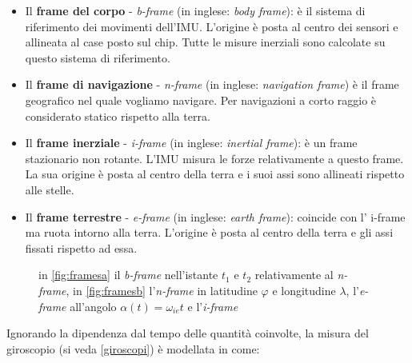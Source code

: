 \begin{itemize}
	\item Il \textbf{frame del corpo} - \textit{b-frame} (in inglese: \textit{body frame}): è il sistema							 di riferimento dei movimenti dell'IMU. L'origine è posta al centro dei sensori e allineata al case posto sul chip. Tutte le misure inerziali sono calcolate su questo sistema di riferimento.
	\item Il \textbf{frame di navigazione} - \textit{n-frame} (in inglese: \textit{navigation frame}) è il frame geografico nel quale vogliamo navigare. Per navigazioni a corto raggio è considerato statico rispetto alla terra.
	\item Il \textbf{frame inerziale} - \textit{i-frame} (in inglese: \textit{inertial frame}): è un frame stazionario non rotante. L'IMU misura le forze relativamente a questo frame. La sua origine è posta al centro della terra e i suoi assi sono allineati rispetto alle stelle.
	\item Il \textbf{frame terrestre} - \textit{e-frame} (in inglese: \textit{earth frame}): coincide con l' i-frame ma ruota intorno alla terra. L'origine è posta al centro della terra e gli assi fissati rispetto ad essa.
\end{itemize}



\begin{figure}[H]
	\centering    
	\label{fig:frames}
	\caption{in \ref{fig:framesa} il \textit{b-frame} nell'istante $t_1$ e $t_2$ relativamente al \textit{n-frame}, in \ref{fig:framesb} l'\textit{n-frame} in latitudine $\varphi$ e longitudine $\lambda$, l'\textit{e-frame} all'angolo $\alpha(t)= \omega_{ie}t$ e l'\textit{i-frame}}
\end{figure}
Ignorando la dipendenza dal tempo delle quantità coinvolte, la misura del giroscopio (si veda \ref{giroscopi}) è modellata in \cite{gyromodel} come:

